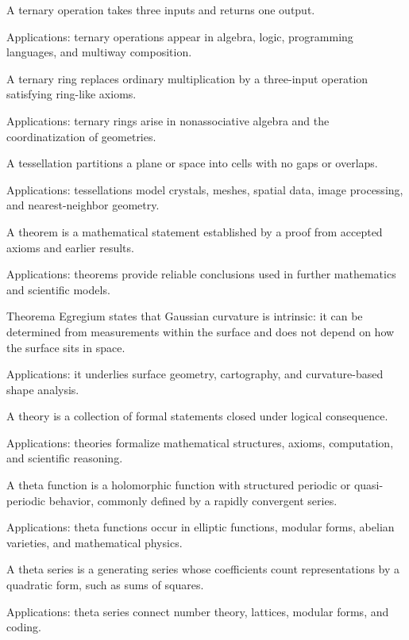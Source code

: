 A ternary operation takes three inputs and returns one output. \par\noindent Applications: ternary operations appear in algebra, logic, programming languages, and multiway composition.

A ternary ring replaces ordinary multiplication by a three-input operation satisfying ring-like axioms. \par\noindent Applications: ternary rings arise in nonassociative algebra and the coordinatization of geometries.

A tessellation partitions a plane or space into cells with no gaps or overlaps. \par\noindent Applications: tessellations model crystals, meshes, spatial data, image processing, and nearest-neighbor geometry.

A theorem is a mathematical statement established by a proof from accepted axioms and earlier results. \par\noindent Applications: theorems provide reliable conclusions used in further mathematics and scientific models.

Theorema Egregium states that Gaussian curvature is intrinsic: it can be determined from measurements within the surface and does not depend on how the surface sits in space. \par\noindent Applications: it underlies surface geometry, cartography, and curvature-based shape analysis.

A theory is a collection of formal statements closed under logical consequence. \par\noindent Applications: theories formalize mathematical structures, axioms, computation, and scientific reasoning.

A theta function is a holomorphic function with structured periodic or quasi-periodic behavior, commonly defined by a rapidly convergent series. \par\noindent Applications: theta functions occur in elliptic functions, modular forms, abelian varieties, and mathematical physics.

A theta series is a generating series whose coefficients count representations by a quadratic form, such as sums of squares. \par\noindent Applications: theta series connect number theory, lattices, modular forms, and coding.

